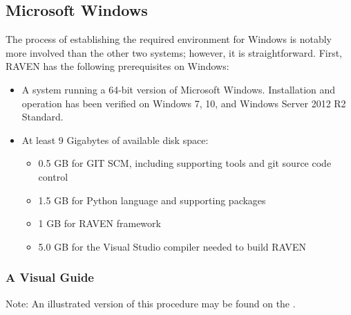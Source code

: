 \subsection{Microsoft Windows}
\label{sec:install windows}

The process of establishing the required environment for Windows is notably more involved than the other two
systems; however, it is straightforward.  First, RAVEN has the following prerequisites on Windows:

\begin{itemize}
    \item A system running a 64-bit version of Microsoft Windows. Installation and operation
        has been verified on Windows 7, 10, and Windows Server 2012 R2 Standard.
    \item At least 9 Gigabytes of available disk space:
    \begin{itemize}
        \item 0.5 GB for GIT SCM, including supporting tools and git source code control
        \item 1.5 GB for Python language and supporting packages
        \item 1 GB for RAVEN framework
        \item 5.0 GB for the Visual Studio compiler needed to build RAVEN
    \end{itemize}
\end{itemize}

\subsubsection{A Visual Guide}
Note: An illustrated version of this procedure may be found on the \wiki.

